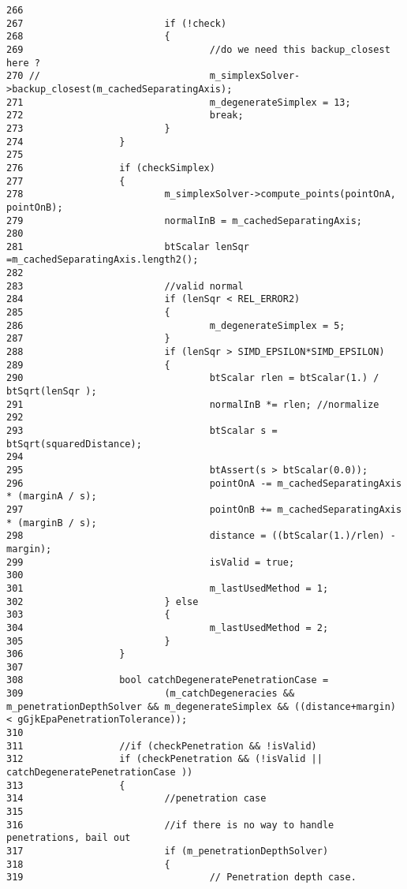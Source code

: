 \begin{Code}
\begin{verbatim}
266 
267                         if (!check)
268                         {
269                                 //do we need this backup_closest here ?
270 //                              m_simplexSolver->backup_closest(m_cachedSeparatingAxis);
271                                 m_degenerateSimplex = 13;
272                                 break;
273                         }
274                 }
275 
276                 if (checkSimplex)
277                 {
278                         m_simplexSolver->compute_points(pointOnA, pointOnB);
279                         normalInB = m_cachedSeparatingAxis;
280 
281                         btScalar lenSqr =m_cachedSeparatingAxis.length2();
282                         
283                         //valid normal
284                         if (lenSqr < REL_ERROR2)
285                         {
286                                 m_degenerateSimplex = 5;
287                         } 
288                         if (lenSqr > SIMD_EPSILON*SIMD_EPSILON)
289                         {
290                                 btScalar rlen = btScalar(1.) / btSqrt(lenSqr );
291                                 normalInB *= rlen; //normalize
292 
293                                 btScalar s = btSqrt(squaredDistance);
294                         
295                                 btAssert(s > btScalar(0.0));
296                                 pointOnA -= m_cachedSeparatingAxis * (marginA / s);
297                                 pointOnB += m_cachedSeparatingAxis * (marginB / s);
298                                 distance = ((btScalar(1.)/rlen) - margin);
299                                 isValid = true;
300                                 
301                                 m_lastUsedMethod = 1;
302                         } else
303                         {
304                                 m_lastUsedMethod = 2;
305                         }
306                 }
307 
308                 bool catchDegeneratePenetrationCase = 
309                         (m_catchDegeneracies && m_penetrationDepthSolver && m_degenerateSimplex && ((distance+margin) < gGjkEpaPenetrationTolerance));
310 
311                 //if (checkPenetration && !isValid)
312                 if (checkPenetration && (!isValid || catchDegeneratePenetrationCase ))
313                 {
314                         //penetration case
315 
316                         //if there is no way to handle penetrations, bail out
317                         if (m_penetrationDepthSolver)
318                         {
319                                 // Penetration depth case.

\end{verbatim}
\end{Code}
